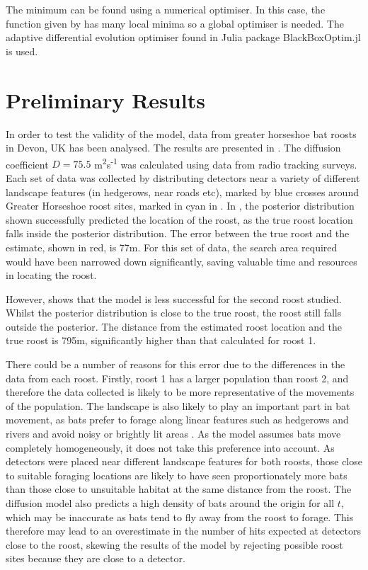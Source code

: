 The minimum can be found using a numerical optimiser. In this case, the function given by  has many local minima so a global optimiser is needed. The adaptive differential evolution optimiser  found in Julia package BlackBoxOptim.jl \cite{Feldt2018} is used.


\section{Preliminary Results}
\label{chapter:results}

In order to test the validity of the model, data from greater horseshoe bat
roosts in Devon, UK has been analysed. The results are presented in
. The diffusion coefficient $D = 75.5$
m\textsuperscript{2}s\textsuperscript{-1} was calculated using data from radio
tracking surveys. Each set of data was collected by distributing detectors near
a variety of different landscape features (in hedgerows, near roads etc), marked
by blue crosses around Greater Horseshoe roost sites, marked in cyan in . In
, the posterior distribution shown successfully
predicted the location of the roost, as the true roost location falls inside the
posterior distribution. The error between the true roost and the estimate,
shown in red, is 77m. For this set of data, the search area required would have
been narrowed down significantly, saving valuable time and resources in locating
the roost.

However,  shows that the model is less successful for
the second roost studied. Whilst the posterior distribution is close to the true
roost, the roost still falls outside the posterior. The distance from the
estimated roost location and the true roost is 795m, significantly higher than
that calculated for roost 1.

There could be a number of reasons for this error due to the differences in the
data from each roost. Firstly, roost 1 has a larger population than roost 2, and
therefore the data collected is likely to be more representative of the
movements of the population. The landscape is also likely to play an important
part in bat movement, as bats prefer to forage along linear features such as
hedgerows and rivers and avoid noisy or brightly lit areas \cite{Stone2009}. As the model assumes
bats move completely homogeneously, it does not take this preference into
account. As detectors were placed near different landscape features for both
roosts, those close to suitable foraging locations are likely to have seen
proportionately more bats than those close to unsuitable habitat at the same
distance from the roost. The diffusion model also predicts a high density of
bats around the origin for all $t$, which may be inaccurate as bats tend to fly
away from the roost to forage. This therefore may lead to an overestimate in the
number of hits expected at detectors close to the roost, skewing the results
of the model by rejecting possible roost sites because they are close to a
detector.


